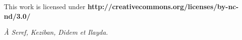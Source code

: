 \clearpage\null\vfill
\thispagestyle{empty}
\begin{minipage}[b]{.9\textwidth}
  \begin{center}
  \setlength{\parskip}{.5\baselineskip}
  {\color{phdcol0}%
   \ccLogo\hspace{.1cm}%
   \ccAttribution\hspace{.1cm}%
   \ccNonCommercial\hspace{.1cm}%
   \ccNoDerivatives}\hspace{.15cm}%
  \footnotesize%
  This work is licensed under {\color{phdcol1}\textbf{http://creativecommons.org/licenses/by-nc-nd/3.0/}}
  \end{center}
\end{minipage}
\vspace*{2\baselineskip}
\clearpage
\thispagestyle{empty}
\begin{flushright}
  \textit{À Seref, Keziban, Didem et Ilayda.}
\end{flushright}
%

%
%
%
%
%
%
%
%
%
%
%
%
%
%
%
%
%
%
%







